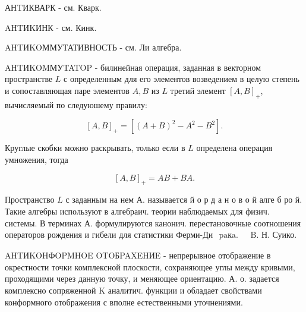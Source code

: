 \documentclass[10pt]{article}
\begin{document}
АНTИКВАРК - см. Кварк.



AHTИKИНК - см. Кинк.



AHTИKOММУТАТИВНОСТЬ - см. Ли алгебра.



AHTИKOMМУTATOP - билинейная операция, заданная в векторном пространстве $L$ с определенным для его элементов возведением в целую степень и сопоставляющая паре элементов $A, B$ из $L$ третий элемент $[A, B]_{+}$, вычисляемый по следуюшему правилу:



\[

[A, B]_{+}=\left[(A+B)^{2}-A^{2}-B^{2}\right] .

\]



Круглые скобки можно раскрывать, только если в $L$ определена операция умножения, тогда



\[

[A, B]_{+}=A B+B A .

\]



Пространство $L$ с заданным на нем А. называется й о р д а н о в о й алге б ро й. Такие алгебры используют в алгебраич. теории наблюдаемых для физич. системы. В терминах А. формулируются канонич. перестановочные соотношения операторов рождения и гибели для статистики Ферми-Ди$\begin{array}{ll}\text { paкa. } & \text { B. Н. Суико. }\end{array}$



AHTИKOHФOPMHOE OTOБPAXEHИE - непрерывное отображение в окрестности точки комплексной плоскости, сохраняющее углы между кривыми, проходящими через данную точку, и меняющее ориентацию. А. о. задается комплексно сопряженной $\mathrm{K}$ аналитич. функции и обладает свойствами конформного отображения с вполне естественными уточнениями.
\end{document}
